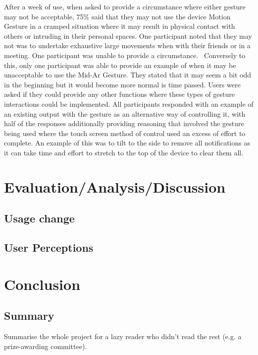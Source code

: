 \documentclass{l4proj}
\begin{document}
After a week of use, when asked to provide a circumstance where either gesture may not be acceptable, 75\% said that they may not use the device Motion Gesture in a cramped situation where it may result in physical contact with others or intruding in their personal spaces. One participant noted that they may not was to undertake exhaustive large movements when with their friends or in a meeting. One participant was unable to provide a circumstance.  Conversely to this, only one participant was able to provide an example of when it may be unacceptable to use the Mid-Ar Gesture. They stated that it may seem a bit odd in the beginning but it would become more normal is time passed. Users were asked if they could provide any other functions where these types of gesture interactions could be implemented. All participants responded with an example of an existing output with the gesture as an alternative way of controlling it, with half of the responses additionally providing reasoning that involved the gesture being used where the touch screen method of control used an excess of effort to complete. An example of this was to tilt to the side to remove all notifications as it can take time and effort to stretch to the top of the device to clear them all.


\chapter{Evaluation/Analysis/Discussion} 


\section{Usage change}

\section{User Perceptions}

\chapter{Conclusion}  
\section{Summary}
Summarise the whole project for a lazy reader who didn't read the rest (e.g. a prize-awarding committee).
\end{document}
